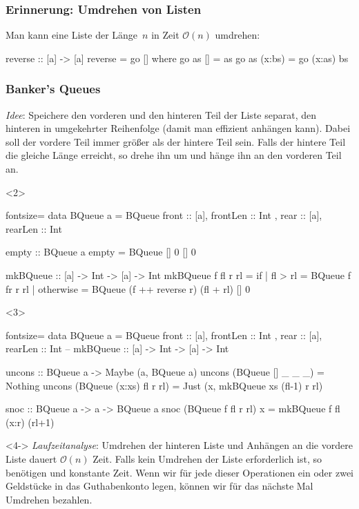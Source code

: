 \documentclass{beamer}
\renewcommand{\O}{\mathcal{O}} %
\begin{document}
\begin{frame}[t,fragile]
  \frametitle{Erinnerung: Umdrehen von Listen}
  Man kann eine Liste der Länge~$n$ in Zeit $\O(n)$ umdrehen:
\begin{haskellcode}
reverse :: [a] -> [a]
reverse = go []
  where go as [] = as
        go as (x:bs) = go (x:as) bs
\end{haskellcode}
\end{frame}

\begin{frame}[t,fragile]
  \frametitle{
    Banker's Queues
    \hfill
  }
  \textit{Idee}: Speichere den vorderen und den hinteren Teil der Liste separat, den hinteren in umgekehrter Reihenfolge (damit man effizient anhängen kann).
  Dabei soll der vordere Teil immer größer als der hintere Teil sein.
  Falls der hintere Teil die gleiche Länge erreicht, so drehe ihn um und hänge ihn an den vorderen Teil an.
\begin{onlyenv}<2>
\begin{haskellcode*}{fontsize=\normalsize}
data BQueue a = BQueue { front :: [a], frontLen :: Int
                       , rear  :: [a], rearLen  :: Int }

empty :: BQueue a
empty = BQueue [] 0 [] 0

mkBQueue :: [a] -> Int -> [a] -> Int
mkBQueue f fl r rl = if
  | fl > rl   = BQueue f fr r rl
  | otherwise = BQueue (f ++ reverse r) (fl + rl) [] 0
\end{haskellcode*}
\end{onlyenv}
\begin{onlyenv}<3>
\begin{haskellcode*}{fontsize=\normalsize}
data BQueue a = BQueue { front :: [a], frontLen :: Int
                       , rear  :: [a], rearLen  :: Int }
-- mkBQueue :: [a] -> Int -> [a] -> Int

uncons :: BQueue a -> Maybe (a, BQueue a)
uncons (BQueue [] _ _ _) = Nothing
uncons (BQueue (x:xs) fl r rl) =
  Just (x, mkBQueue xs (fl-1) r rl)

snoc :: BQueue a -> a -> BQueue a
snoc (BQueue f fl r rl) x = mkBQueue f fl (x:r) (rl+1)
\end{haskellcode*}
\end{onlyenv}

\begin{onlyenv}<4->
  \vspace{0.5cm}
  \textit{Laufzeitanalyse}: Umdrehen der hinteren Liste und Anhängen an die vordere Liste dauert $\O(n)$ Zeit.
  Falls kein Umdrehen der Liste erforderlich ist, so benötigen  und  konstante Zeit.
  Wenn wir für jede dieser Operationen ein oder zwei Geldstücke in das Guthabenkonto legen, können wir für das nächste Mal Umdrehen bezahlen.
\end{onlyenv}


\end{frame}
\end{document}

